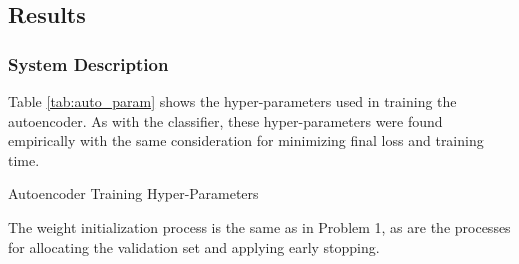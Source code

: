 \documentclass[a4paper, 12pt, titlepage]{article}
\newcommand{\tabRef}[1]{Table \ref{#1}}
\begin{document}
  \subsection{Results}
  \subsubsection{System Description}
  \par \tabRef{tab:auto_param} shows the hyper-parameters used in training
  the autoencoder.
  As with the classifier, these hyper-parameters were found empirically with
  the same consideration for minimizing final loss and training time.
  \begin{table}[htb]
    \centering
    \caption{Autoencoder Training Hyper-Parameters}
    \vspace{-12pt}
    \label{tab:auto_param}
    \vspace{-12pt}
  \end{table}
  \par The weight initialization process is the same as in Problem 1, as are
  the processes for allocating the validation set and applying early stopping.
\end{document}

